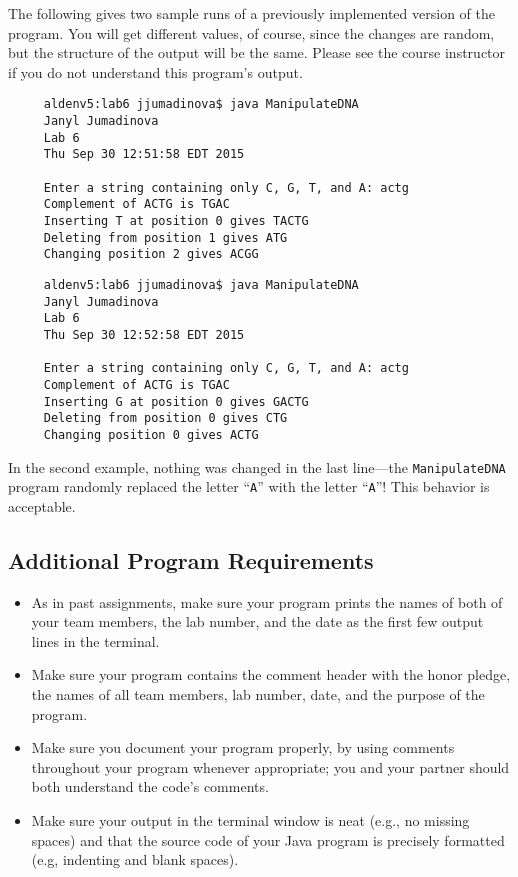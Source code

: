 The following gives two sample runs of a previously implemented version of the program. You will get different values, of course, since the
changes are random, but the structure of the output will be the same. Please see the course instructor if you do not
understand this program's output.

\begin{verbatim}
     aldenv5:lab6 jjumadinova$ java ManipulateDNA
     Janyl Jumadinova
     Lab 6
     Thu Sep 30 12:51:58 EDT 2015

     Enter a string containing only C, G, T, and A: actg
     Complement of ACTG is TGAC
     Inserting T at position 0 gives TACTG
     Deleting from position 1 gives ATG
     Changing position 2 gives ACGG
\end{verbatim}

\begin{verbatim}
     aldenv5:lab6 jjumadinova$ java ManipulateDNA
     Janyl Jumadinova
     Lab 6
     Thu Sep 30 12:52:58 EDT 2015

     Enter a string containing only C, G, T, and A: actg
     Complement of ACTG is TGAC
     Inserting G at position 0 gives GACTG
     Deleting from position 0 gives CTG
     Changing position 0 gives ACTG
\end{verbatim}

In the second example, nothing was changed in the last line---the {\tt ManipulateDNA} program randomly replaced the
letter ``{\tt A}'' with the letter ``{\tt A}''!  This behavior is acceptable.

\vspace{-0.05in}
\subsection*{Additional Program Requirements}
\vspace{-0.05in}
\begin{itemize}

\item As in past assignments, make sure your program prints the names of both of your team members, the lab number, and
  the date as the first few output lines in the terminal.

\item Make sure your program contains the comment header with the honor pledge, the names of all team members, lab
  number, date, and the purpose of the program.

\item Make sure you document your program properly, by using comments throughout your program whenever appropriate; you
  and your partner should both understand the code's comments.

\item Make sure your output in the terminal window is neat (e.g., no missing spaces) and that the source code of your
  Java program is precisely formatted (e.g, indenting and blank spaces).

\end{itemize}

